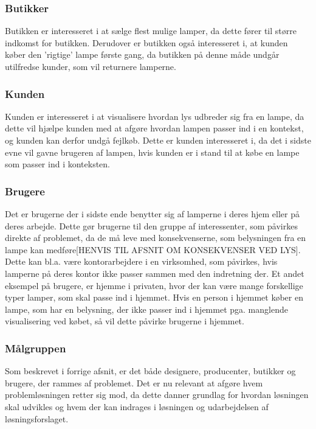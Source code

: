 \subsubsection{Butikker}
Butikken er interesseret i at sælge flest mulige lamper, da dette fører til større indkomst for butikken. Derudover er butikken også interesseret i, at kunden køber den 'rigtige' lampe første gang, da butikken på denne måde undgår utilfredse kunder, som vil returnere lamperne.

\subsubsection{Kunden}
Kunden er interesseret i at visualisere hvordan lys udbreder sig fra en lampe, da dette vil hjælpe kunden med at afgøre hvordan lampen passer ind i en kontekst, og kunden kan derfor undgå fejlkøb. Dette er kunden interesseret i, da det i sidste evne vil gavne brugeren af lampen, hvis kunden er i stand til at købe en lampe som passer ind i konteksten.

\subsubsection{Brugere}
Det er brugerne der i sidste ende benytter sig af lamperne i deres hjem eller på deres arbejde. Dette gør brugerne til den gruppe af interessenter, som påvirkes direkte af problemet, da de må leve med konsekvenserne, som belysningen fra en lampe kan medføre[HENVIS TIL AFSNIT OM KONSEKVENSER VED LYS]. Dette kan bl.a. være kontorarbejdere i en virksomhed, som påvirkes, hvis lamperne på deres kontor ikke passer sammen med den indretning der. Et andet eksempel på brugere, er hjemme i privaten, hvor der kan være mange forskellige typer lamper, som skal passe ind i hjemmet. Hvis en person i hjemmet køber en lampe, som har en belysning, der ikke passer ind i hjemmet pga. manglende visualisering ved købet, så vil dette påvirke brugerne i hjemmet. 

\subsubsection{Målgruppen}
Som beskrevet i forrige afsnit, er det både designere, producenter, butikker og brugere, der rammes af problemet. Det er nu relevant at afgøre hvem problemløsningen retter sig mod, da dette danner grundlag for hvordan løsningen skal udvikles og hvem der kan indrages i løsningen og udarbejdelsen af løsningsforslaget. 


